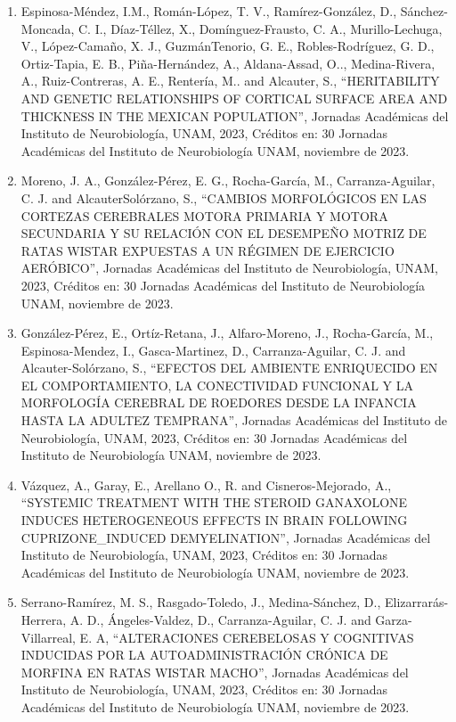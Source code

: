 \begin{enumerate}
\item  Espinosa-Méndez, I.M., Román-López, T. V., Ramírez-González, D., Sánchez-Moncada, C. I., Díaz-Téllez, X., 
Domínguez-Frausto, C. A., Murillo-Lechuga, V., López-Camaño, X. J., GuzmánTenorio, G. E., Robles-Rodríguez, G. D., 
Ortiz-Tapia, E. B., Piña-Hernández, A., Aldana-Assad, O.., Medina-Rivera, A., Ruiz-Contreras, A. E., Rentería, M.. and 
Alcauter, S., “HERITABILITY AND GENETIC RELATIONSHIPS OF CORTICAL SURFACE AREA AND THICKNESS IN THE MEXICAN POPULATION”, 
Jornadas Académicas del Instituto de Neurobiología, UNAM, 2023, Créditos en: 30 Jornadas Académicas del Instituto de 
Neurobiología UNAM, noviembre de 2023.

\item  Moreno, J. A., González-Pérez, E. G., Rocha-García, M., Carranza-Aguilar, C. J. and AlcauterSolórzano, S., “CAMBIOS 
MORFOLÓGICOS EN LAS CORTEZAS CEREBRALES MOTORA PRIMARIA Y MOTORA SECUNDARIA Y SU RELACIÓN CON EL DESEMPEÑO MOTRIZ DE RATAS 
WISTAR EXPUESTAS A UN RÉGIMEN DE EJERCICIO AERÓBICO”, Jornadas Académicas del Instituto de Neurobiología, UNAM, 2023, 
Créditos en: 30 Jornadas Académicas del Instituto de Neurobiología UNAM, noviembre de 2023.

\item  González-Pérez, E., Ortíz-Retana, J., Alfaro-Moreno, J., Rocha-García, M., Espinosa-Mendez, I., Gasca-Martinez, D., 
Carranza-Aguilar, C. J. and Alcauter-Solórzano, S., “EFECTOS DEL AMBIENTE ENRIQUECIDO EN EL COMPORTAMIENTO, LA CONECTIVIDAD 
FUNCIONAL Y LA MORFOLOGÍA CEREBRAL DE ROEDORES DESDE LA INFANCIA HASTA LA ADULTEZ TEMPRANA”, Jornadas Académicas del 
Instituto de Neurobiología, UNAM, 2023, Créditos en: 30 Jornadas Académicas del Instituto de Neurobiología UNAM, noviembre de 
2023.

\item  Vázquez, A., Garay, E., Arellano O., R. and Cisneros-Mejorado, A., “SYSTEMIC TREATMENT WITH THE STEROID GANAXOLONE 
INDUCES HETEROGENEOUS EFFECTS IN BRAIN FOLLOWING CUPRIZONE_INDUCED DEMYELINATION”, Jornadas Académicas del Instituto de 
Neurobiología, UNAM, 2023, Créditos en: 30 Jornadas Académicas del Instituto de Neurobiología UNAM, noviembre de 2023.

\item  Serrano-Ramírez, M. S., Rasgado-Toledo, J., Medina-Sánchez, D., Elizarrarás-Herrera, A. D., Ángeles-Valdez, D., 
Carranza-Aguilar, C. J. and Garza-Villarreal, E. A, “ALTERACIONES CEREBELOSAS Y COGNITIVAS INDUCIDAS POR LA 
AUTOADMINISTRACIÓN CRÓNICA DE MORFINA EN RATAS WISTAR MACHO”, Jornadas Académicas del Instituto de Neurobiología, UNAM, 2023, 
Créditos en: 30 Jornadas Académicas del Instituto de Neurobiología UNAM, noviembre de 2023.


\end{enumerate}
